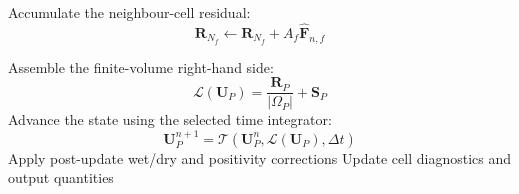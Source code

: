 \documentclass[11pt]{article}
\begin{document}
\begin{algorithm}[h!]
\begin{algorithmic}[1]
              \State Accumulate the neighbour-cell residual:
              \[
                  \mathbf{R}_{N_f}
                  \gets
                  \mathbf{R}_{N_f}
                  +
                  A_f\widehat{\mathbf{F}}_{n,f}
                  \label{eq:neighbour_residual_update_algorithm}
              \]
          \EndIf
      \EndFor

          \State Assemble the finite-volume right-hand side:
          \[
              \mathcal{L}(\mathbf{U}_P)
              =
              \frac{\mathbf{R}_P}{|\Omega_P|}
              +
              \mathbf{S}_P
              \label{eq:fv_rhs_algorithm}
          \]
          \State Advance the state using the selected time integrator:
          \[
              \mathbf{U}_P^{n+1}
              =
              \mathcal{T}
              \left(
                  \mathbf{U}_P^n,
                  \mathcal{L}(\mathbf{U}_P),
                  \Delta t
              \right)
              \label{eq:time_update_operator_algorithm}
          \]
          \State Apply post-update wet/dry and positivity corrections
          \State Update cell diagnostics and output quantities
      \EndFor

  \end{algorithmic}
\end{algorithm}
\end{document}
